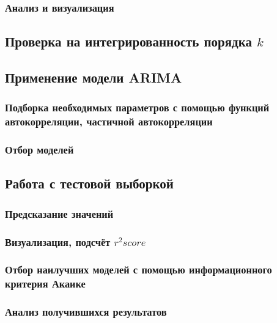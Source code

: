 \documentclass{article}
\begin{document}
    \subsubsection{Анализ и визуализация}
  
  \newpage
    
  \subsection{Проверка на интегрированность порядка $k$}
  
  \subsection{Применение модели ARIMA}
    
    \subsubsection{Подборка необходимых параметров с помощью функций автокорреляции, частичной автокорреляции}
    
    \subsubsection{Отбор моделей}
  
  \subsection{Работа с тестовой выборкой}
  
    \subsubsection{Предсказание значений}
    
    \subsubsection{Визуализация, подсчёт $r^2 score$}
    
    \subsubsection{Отбор наилучших моделей с помощью информационного критерия Акаике}
    
    \subsubsection{Анализ получившихся результатов}
\end{document}
